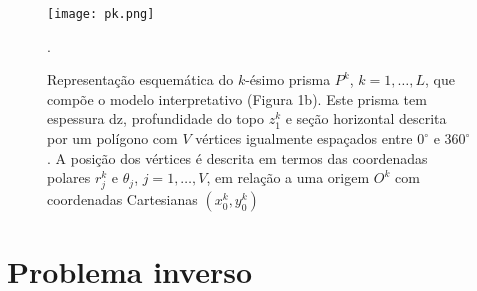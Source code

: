 \begin{figure}[!htb]
	\centering
	\texttt{[image: pk.png]}
	\caption{Representação esquemática do $k$-ésimo prisma $P^k$, $k=1,\dots, L$, que compõe o modelo interpretativo (Figura 1b). Este prisma tem espessura dz, profundidade do topo $z_1^k$ e seção horizontal descrita por um polígono com $V$ vértices igualmente espaçados entre $0^{\circ}$ e $360^{\circ}$. A posição dos vértices é descrita em termos das coordenadas polares $r_j^k$ e $\theta_j$, $j=1,\dots, V$, em relação a uma origem $O^k$ com coordenadas Cartesianas $(x_0^k, y_0^k)$}.
	\label{fig:pk}
\end{figure}
\pagebreak

\section{Problema inverso}

